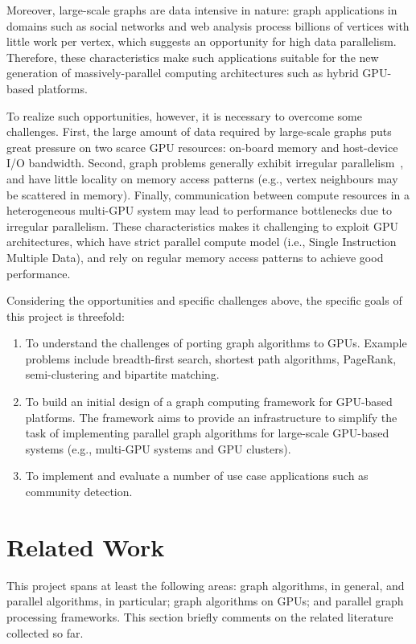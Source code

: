 \documentclass{acm_proc_article-sp}[12pt]
\begin{document}
Moreover, large-scale graphs are data intensive in nature: graph applications in domains such as social networks and web analysis process billions of vertices with little work per vertex, which suggests an opportunity for high data parallelism. Therefore, these characteristics make such applications suitable for the new generation of massively-parallel computing architectures such as hybrid GPU-based platforms.

To realize such opportunities, however, it is necessary to overcome some challenges. First, the large amount of data required by large-scale graphs puts great pressure on two scarce GPU resources: on-board memory and host-device I/O bandwidth. Second, graph problems generally exhibit irregular parallelism~\cite{Kulkarni2009}, and have little locality on memory access patterns (e.g., vertex neighbours may be scattered in memory). Finally, communication between compute resources in a heterogeneous multi-GPU system may lead to performance bottlenecks due to irregular parallelism. These characteristics makes it challenging to exploit GPU architectures, which have strict parallel compute model (i.e., Single Instruction Multiple Data), and rely on regular memory access patterns to achieve good performance.

Considering the opportunities and specific challenges above, the specific goals of this project is threefold:

\begin{enumerate}
  \item To understand the challenges of porting graph algorithms to GPUs. Example problems include breadth-first search, shortest path algorithms, PageRank, semi-clustering and bipartite matching.
  
  \item To build an initial design of a graph computing framework for GPU-based platforms. The framework aims to provide an infrastructure to simplify the task of implementing parallel graph algorithms for large-scale GPU-based systems (e.g., multi-GPU systems and GPU clusters).

  \item To implement and evaluate a number of use case applications such as community detection. 
\end{enumerate}

\section{Related Work}
\label{sec:related}
This project spans at least the following areas: graph algorithms, in general, and parallel algorithms, in particular; graph algorithms on GPUs; and parallel graph processing frameworks. This section briefly comments on the related literature collected so far.
\end{document}
